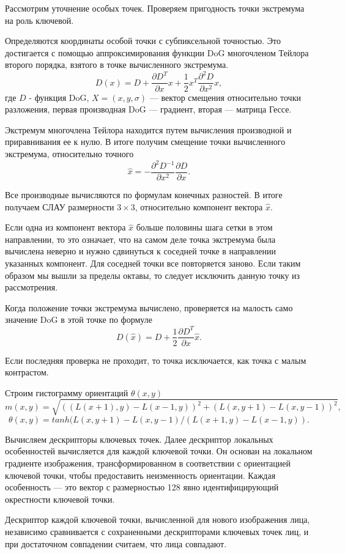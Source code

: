 \documentclass[a4paper,12pt]{report}
\numberwithin{equation}{section}
\begin{document}
Рассмотрим уточнение особых точек. Проверяем пригодность точки экстремума на
роль ключевой.


Определяются координаты особой точки с субпиксельной точностью. Это достигается
с помощью аппроксимирования функции DoG многочленом Тейлора второго порядка,
взятого в точке вычисленного экстремума.
\[ D(x) = D + \frac{\partial D^T}{\partial x}x + \frac{1}{2}x^T\frac{\partial^2D}{\partial x^2}x, \]
где $D$ - функция DoG, $X = (x,y,\sigma)$ --- вектор смещения относительно точки
разложения, первая производная DoG --- градиент, вторая --- матрица Гессе.


Экстремум многочлена Тейлора находится путем вычисления производной и
приравнивания ее к нулю. В итоге получим смещение точки вычисленного экстремума,
относительно точного
\[ \widehat{x} = -\frac{\partial^2D^{-1}}{\partial x^2}\frac{\partial D}{\partial x}. \]

Все производные вычисляются по формулам конечных разностей. В итоге получаем
СЛАУ размерности $3 \times 3$, относительно компонент вектора $\widehat{x}$.


Если одна из компонент вектора $\widehat{x}$ больше половины шага сетки в этом
направлении, то это означает, что на самом деле точка экстремума была вычислена
неверно и нужно сдвинуться к соседней точке в направлении указанных
компонент. Для соседней точки все повторяется заново. Если таким образом мы
вышли за пределы октавы, то следует исключить данную точку из рассмотрения.


Когда положение точки экстремума вычислено, проверяется на малость само значение
DoG в этой точке по формуле
\[ D(\widehat{x}) = D + \frac{1}{2}\frac{\partial D^T}{\partial x}\widehat{x}. \]

Если последняя проверка не проходит, то точка исключается, как точка с малым
контрастом.


Строим гистограмму ориентаций $\theta(x,y)$
\[m(x,y) = \sqrt{((L(x+1),y) - L(x-1,y))^2 + (L(x,y+1)-L(x,y-1))^2}, \]
\[\theta(x,y) = tanh(L(x,y+1) - L(x,y-1) / (L(x+1,y) - L(x-1,y)). \]

Вычисляем дескрипторы ключевых точек. Далее дескриптор локальных
особенностей вычисляется для каждой ключевой точки. Он основан на локальном
градиенте изображения, трансформированном в соответствии с ориентацией ключевой
точки, чтобы предоставить неизменность ориентации. Каждая особенность --- это
вектор с размерностью 128 явно идентифицирующий окрестности ключевой точки.


Дескриптор каждой ключевой точки, вычисленной для нового изображения лица,
независимо сравнивается с сохраненными дескрипторами ключевых точек лиц, и при
достаточном совпадении считаем, что лица совпадают.
\end{document}
